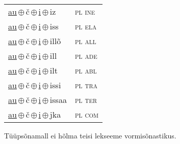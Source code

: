\begin{minipage}{\textwidth}
\begin{sideways}
\begin{tabular}{l l}
\underline{au}\,$\oplus$\,č\,$\oplus$\,\underline{i}\,$\oplus$\,iz & \textsc{ pl ine } \\
\underline{au}\,$\oplus$\,č\,$\oplus$\,\underline{i}\,$\oplus$\,iss & \textsc{ pl ela } \\
\underline{au}\,$\oplus$\,č\,$\oplus$\,\underline{i}\,$\oplus$\,illõ & \textsc{ pl all } \\
\underline{au}\,$\oplus$\,č\,$\oplus$\,\underline{i}\,$\oplus$\,ill & \textsc{ pl ade } \\
\underline{au}\,$\oplus$\,č\,$\oplus$\,\underline{i}\,$\oplus$\,ilt & \textsc{ pl abl } \\
\underline{au}\,$\oplus$\,č\,$\oplus$\,\underline{i}\,$\oplus$\,issi & \textsc{ pl tra } \\
\underline{au}\,$\oplus$\,č\,$\oplus$\,\underline{i}\,$\oplus$\,issaa & \textsc{ pl ter } \\
\underline{au}\,$\oplus$\,č\,$\oplus$\,\underline{i}\,$\oplus$\,jka & \textsc{ pl com } \\
\end{tabular}
\end{sideways}
\label{tab:tüüpsõnamall-auči}

\end{minipage}

 
\vspace{1em}
\noindent Tüüpsõnamall  ei hõlma teisi lekseeme vormi\-sõnastikus.
